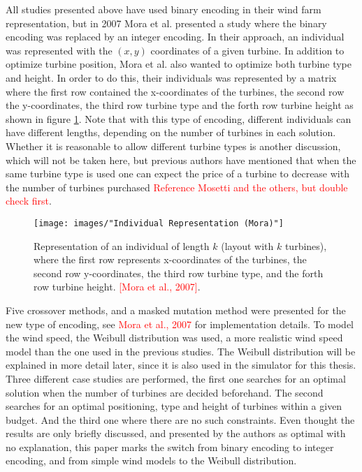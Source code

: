 All studies presented above have used binary encoding in their wind farm representation, but in 2007 Mora et al. presented a study where the binary encoding was replaced by an integer encoding. In their approach, an individual was represented with the $(x, y)$ coordinates of a given turbine. In addition to optimize turbine position, Mora et al. also wanted to optimize both turbine type and height. In order to do this, their individuals was represented by a matrix where the first row contained the x-coordinates of the turbines, the second row the y-coordinates, the third row turbine type and the forth row turbine height as shown in figure \ref{Individual Representation (Mora)}. Note that with this type of encoding, different individuals can have different lengths, depending on the number of turbines in each solution. Whether it is reasonable to allow different turbine types is another discussion, which will not be taken here, but previous authors have mentioned that when the same turbine type is used one can expect the price of a turbine to decrease with the number of turbines purchased \textcolor{red}{Reference Mosetti and the others, but double check first}. \\


\begin{figure}[h!]
\begin{center}
\texttt{[image: images/"Individual Representation (Mora)"]}
\caption{Representation of an individual of length $k$ (layout with $k$ turbines), where the first row represents x-coordinates of the turbines, the second row y-coordinates, the third row turbine type, and the forth row turbine height. \textcolor{red}{[Mora et al., 2007]}.}
\label{Individual Representation (Mora)}
\end{center}
\end{figure}


\noindent Five crossover methods, and a masked mutation method were presented for the new type of encoding, see \textcolor{red}{Mora et al., 2007} for implementation details. To model the wind speed, the Weibull distribution was used, a more realistic wind speed model than the one used in the previous studies. The Weibull distribution will be explained in more detail later, since it is also used in the simulator for this thesis. Three different case studies are performed, the first one searches for an optimal solution when the number of turbines are decided beforehand. The second searches for an optimal positioning, type and height of turbines within a given budget. And the third one where there are no such constraints. Even thought the results are only briefly discussed, and presented by the authors as optimal with no explanation, this paper marks the switch from binary encoding to integer encoding, and from simple wind models to the Weibull distribution.\\


